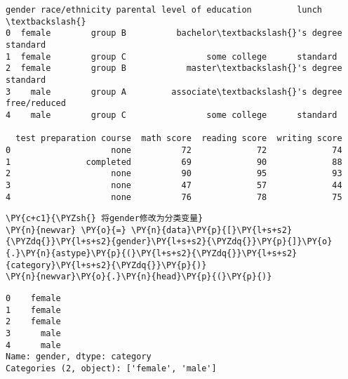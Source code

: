             \begin{tcolorbox}[breakable, size=fbox, boxrule=.5pt, pad at break*=1mm, opacityfill=0]
\begin{Verbatim}[commandchars=\\\{\}]
   gender race/ethnicity parental level of education         lunch  \textbackslash{}
0  female        group B          bachelor\textbackslash{}'s degree      standard
1  female        group C                some college      standard
2  female        group B            master\textbackslash{}'s degree      standard
3    male        group A         associate\textbackslash{}'s degree  free/reduced
4    male        group C                some college      standard

  test preparation course  math score  reading score  writing score
0                    none          72             72             74
1               completed          69             90             88
2                    none          90             95             93
3                    none          47             57             44
4                    none          76             78             75
\end{Verbatim}
\end{tcolorbox}
        
    \begin{tcolorbox}[breakable, size=fbox, boxrule=1pt, pad at break*=1mm,colback=cellbackground, colframe=cellborder]
\begin{Verbatim}[commandchars=\\\{\}]
\PY{c+c1}{\PYZsh{} 将gender修改为分类变量}
\PY{n}{newvar} \PY{o}{=} \PY{n}{data}\PY{p}{[}\PY{l+s+s2}{\PYZdq{}}\PY{l+s+s2}{gender}\PY{l+s+s2}{\PYZdq{}}\PY{p}{]}\PY{o}{.}\PY{n}{astype}\PY{p}{(}\PY{l+s+s2}{\PYZdq{}}\PY{l+s+s2}{category}\PY{l+s+s2}{\PYZdq{}}\PY{p}{)}
\PY{n}{newvar}\PY{o}{.}\PY{n}{head}\PY{p}{(}\PY{p}{)}
\end{Verbatim}
\end{tcolorbox}

            \begin{tcolorbox}[breakable, size=fbox, boxrule=.5pt, pad at break*=1mm, opacityfill=0]
\begin{Verbatim}[commandchars=\\\{\}]
0    female
1    female
2    female
3      male
4      male
Name: gender, dtype: category
Categories (2, object): ['female', 'male']
\end{Verbatim}
\end{tcolorbox}
        
